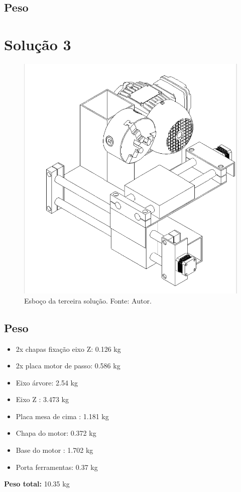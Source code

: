 \subsection{Peso} 


\section{Solução 3}
\begin{figure}[h!]
    \centering
    \includegraphics[width=0.7\linewidth]{images/sol3.png}
    \caption{Esboço da terceira solução. Fonte: Autor.}
    \label{fig:enter-label}
\end{figure}

\subsection{Peso}

\begin{itemize}
    \item 2x chapas fixação eixo Z: 0.126 kg
    \item 2x placa motor de passo: 0.586 kg
    \item Eixo árvore: 2.54 kg
    \item Eixo Z : 3.473 kg
    \item Placa mesa de cima : 1.181 kg
    \item Chapa do motor: 0.372 kg 
    \item Base do motor : 1.702 kg
    \item Porta ferramentas: 0.37 kg
\end{itemize}

\textbf{Peso total: }10.35 kg



